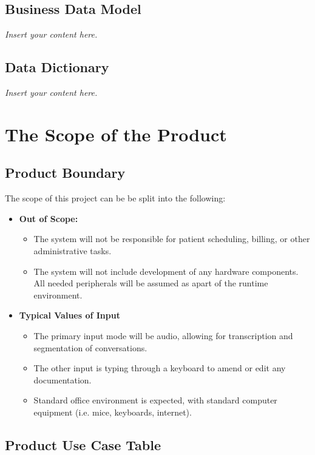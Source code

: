 \documentclass[12pt]{article}
\newcommand{\lips}{\textit{Insert your content here.}}
\begin{document}
\subsection{Business Data Model}
\lips
\subsection{Data Dictionary}
\lips

\section{The Scope of the Product}
\subsection{Product Boundary}
The scope of this project can be be split into the following:

\begin{itemize}
  \item \textbf{Out of Scope:}
  \begin{itemize}
    \item The system will not be responsible for patient scheduling, billing, or other administrative tasks.
    \item The system will not include development of any hardware components. All needed peripherals will be assumed as apart of the runtime environment.
  \end{itemize}
  \item \textbf{Typical Values of Input}
  \begin{itemize}
    \item The primary input mode will be audio, allowing for transcription and segmentation of conversations.
    \item The other input is typing through a keyboard to amend or edit any documentation.
    \item Standard office environment is expected, with standard computer equipment (i.e. mice, keyboards, internet).
  \end{itemize}
\end{itemize}

\subsection{Product Use Case Table}
\end{document}
